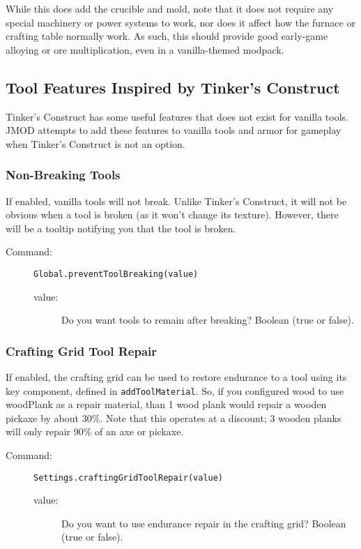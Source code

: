 \documentclass[letterpaper,titlepage,12pt]{article}
\begin{document}
\begin{description}
While this does add the crucible and mold, note that it does not require any special machinery or power systems to work, nor does it affect how the furnace or crafting table normally work.  As such, this should provide good early-game alloying or ore multiplication, even in a vanilla-themed modpack.

\subsection{Tool Features Inspired by Tinker's Construct}

Tinker's Construct has some useful features that does not exist for vanilla tools.  JMOD attempts to add these features to vanilla tools and armor for gameplay when Tinker's Construct is not an option.

\subsubsection{Non-Breaking Tools}

If enabled, vanilla tools will not break.  Unlike Tinker's Construct, it will not be obvious when a tool is broken (as it won't change its texture).  However, there will be a tooltip notifying you that the tool is broken.

\begin{description}
\item[Command:] \texttt{Global.preventToolBreaking(value)}
\begin{description}
\item [value:] Do you want tools to remain after breaking?  Boolean (true or false).
\end{description}
\end{description}

\subsubsection{Crafting Grid Tool Repair}

If enabled, the crafting grid can be used to restore endurance to a tool using its key component, defined in \texttt{addToolMaterial}.  So, if you configured wood to use woodPlank as a repair material, than 1 wood plank would repair a wooden pickaxe by about 30\%.  Note that this operates at a discount; 3 wooden planks will only repair 90\% of an axe or pickaxe.

\begin{description}
\item[Command:] \texttt{Settings.craftingGridToolRepair(value)}
\begin{description}
\item [value:] Do you want to use endurance repair in the crafting grid?  Boolean (true or false).
\end{description}
\end{description}


\end{description}
\end{document}
